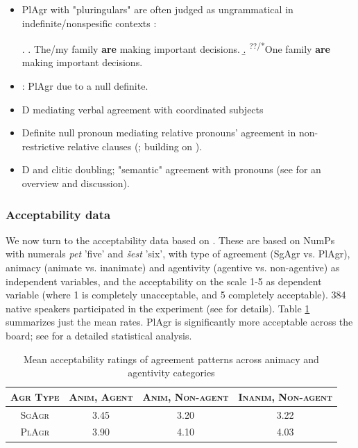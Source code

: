 \begin{itemize}
    \item PlAgr with "pluringulars" are often judged as ungrammatical in indefinite/nonspesific contexts \citep[106]{Danon2014}:

\ex.
\a. The/my family \textbf{are} making important decisions.
\b. \textsuperscript{??/*}One family \textbf{are} making important decisions.

\item \citet{Sauerland2004snippets}: PlAgr due to a null definite.

\bigbreak
\item D mediating verbal agreement with coordinated subjects \citep{mitic-arsenijevic-2019}
\item Definite null pronoun mediating relative pronouns' agreement in non-restrictive relative clauses (\citealt{Arsenijevic2016pluringulars}; building on \citealt{Postal1994, deVries2002, deVries2006}).

\bigbreak

\item D and clitic doubling; "semantic" agreement with pronouns (see \citealt{Milosavljevic2017} for an overview and discussion).

\end{itemize}


\subsubsection{Acceptability data} \label{subsect:acceptabiulity-data}

We now turn to the acceptability data based on \citet{Milosavljevic2018nasledje}. These are based on NumPs with numerals \textit{pet} 'five' and \textit{šest} 'six', with type of agreement (SgAgr vs. PlAgr), animacy (animate vs. inanimate) and agentivity (agentive vs. non-agentive) as independent variables, and the acceptability on the scale 1-5 as dependent variable (where 1 is completely unacceptable, and 5 completely acceptable). 384 native speakers participated in the experiment (see \citealt{Milosavljevic2018nasledje} for details). Table \ref{tab:animacy-agentivity} summarizes just the mean rates. PlAgr is significantly more acceptable across the board; see \citet{Milosavljevic2018nasledje} for a detailed statistical analysis.


\begin{table}[h]
    \centering
    \caption{Mean acceptability ratings of agreement patterns across animacy and agentivity categories}
    \label{tab:animacy-agentivity}
    \begin{tabular}{|c | c c c |} 
        \hline
        \textsc{Agr Type} & \textsc{Anim, Agent} & \textsc{Anim, Non-agent} & \textsc{Inanim, Non-agent} \\ 
        \hline\hline
        \textsc{SgAgr} & 3.45 & 3.20 & 3.22 \\ 
        \hline
        \textsc{PlAgr}  & 3.90 & 4.10 & 4.03 \\ 
        \hline
    \end{tabular}
\end{table}


